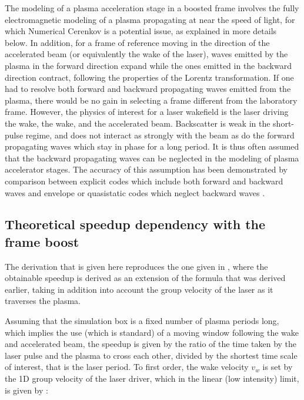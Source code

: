The modeling of a plasma acceleration stage in a boosted frame
involves the fully electromagnetic modeling of a plasma propagating at near the speed of light, for which Numerical Cerenkov
\cite{Borisjcp73,Habericnsp73} is a potential issue, as explained in more details below.
In addition, for a frame of reference moving in the direction of the accelerated beam (or equivalently the wake of the laser),
waves emitted by the plasma in the forward direction expand
while the ones emitted in the backward direction contract, following the properties of the Lorentz transformation.
If one had to resolve both forward and backward propagating
waves emitted from the plasma, there would be no gain in selecting a frame different from the laboratory frame. However,
the physics of interest for a laser wakefield is the laser driving the wake, the wake, and the accelerated beam.
Backscatter is weak in the short-pulse regime, and does not
interact as strongly with the beam as do the forward propagating waves
which stay in phase for a long period. It is thus often assumed that the backward propagating waves
can be neglected in the modeling of plasma accelerator stages. The accuracy  of this assumption has been demonstrated by
comparison between explicit codes which include both forward and backward waves and envelope or quasistatic codes which neglect backward waves
\cite{Geddesjp08,Geddespac09,Cowanaac08}.

\subsection{Theoretical speedup dependency with the frame boost}
The derivation that is given here reproduces the one given in \cite{Vaypop2011}, where the obtainable speedup is derived as an extension of the formula that was derived earlier\cite{Vayprl07}, taking in addition into account the group velocity of the laser as it traverses the plasma.

Assuming that the simulation box is a fixed number of plasma periods long, which implies the use (which is standard) of a moving window following
the wake and accelerated beam, the speedup is given by the ratio of the time taken by the laser pulse and the plasma to cross each other, divided by the shortest time scale of interest, that is the laser period. To first order, the wake velocity $v_w$ is set by the 1D group velocity of the laser driver, which in the linear (low intensity) limit, is given by \cite{Esareyrmp09}:

